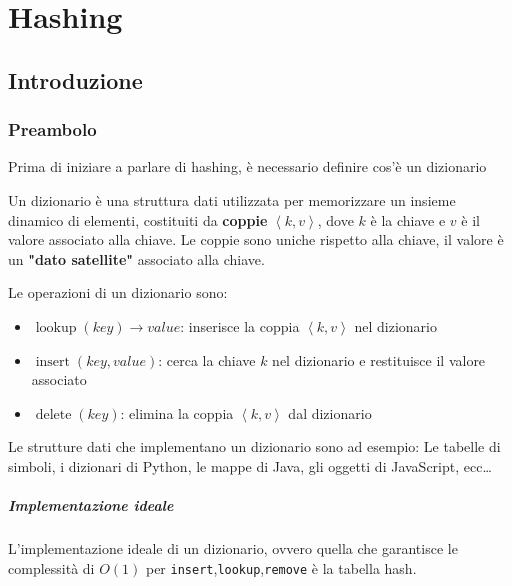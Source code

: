 \chapter{Hashing}
\thispagestyle{chapterInit}

\section{Introduzione}
    \subsection{Preambolo}
        Prima di iniziare a parlare di hashing, è necessario definire cos'è un dizionario
        \begin{definition}[Dizionario]
            Un dizionario è una struttura dati utilizzata per memorizzare un insieme dinamico di elementi, costituiti da \textbf{coppie} $\left< k, v \right>$, dove $k$ è la chiave e $v$ è il valore associato alla chiave. Le coppie sono uniche rispetto alla chiave, il valore è un \textbf{"dato satellite"} associato alla chiave.
        \end{definition}
        Le operazioni di un dizionario sono:
        \begin{itemize}
            \item $\operatorname{lookup}(key)\rightarrow value$: inserisce la coppia $\left< k, v \right>$ nel dizionario
            \item $\operatorname{insert}(key, value)$: cerca la chiave $k$ nel dizionario e restituisce il valore associato
            \item $\operatorname{delete}(key)$: elimina la coppia $\left< k, v \right>$ dal dizionario
        \end{itemize}
        Le strutture dati che implementano un dizionario sono ad esempio: Le tabelle di simboli, i dizionari di Python, le mappe di Java, gli oggetti di JavaScript, ecc\dots
        \paragraph{Implementazione ideale} L'implementazione ideale di un dizionario, ovvero quella che garantisce le complessità di $O(1)$ per \texttt{insert},\texttt{lookup},\texttt{remove} è la tabella hash.
        
